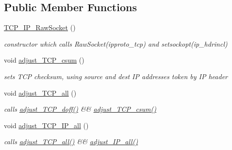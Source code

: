 \subsection*{Public Member Functions}
\begin{CompactItemize}
\item 
\hypertarget{classsocketpp_1_1TCP__IP__RawSocket_1b08f12274fd9590f805bc876c44edd9}{
\hyperlink{classsocketpp_1_1TCP__IP__RawSocket_1b08f12274fd9590f805bc876c44edd9}{TCP\_\-IP\_\-RawSocket} ()}
\label{classsocketpp_1_1TCP__IP__RawSocket_1b08f12274fd9590f805bc876c44edd9}

\begin{CompactList}\small\item\em constructor which calls RawSocket(ipproto\_\-tcp) and setsockopt(ip\_\-hdrincl) \item\end{CompactList}\item 
\hypertarget{classsocketpp_1_1TCP__IP__RawSocket_c203b188308532333bdf53a4e18bc230}{
void \hyperlink{classsocketpp_1_1TCP__IP__RawSocket_c203b188308532333bdf53a4e18bc230}{adjust\_\-TCP\_\-csum} ()}
\label{classsocketpp_1_1TCP__IP__RawSocket_c203b188308532333bdf53a4e18bc230}

\begin{CompactList}\small\item\em sets TCP checksum, using source and dest IP addresses token by IP header \item\end{CompactList}\item 
\hypertarget{classsocketpp_1_1TCP__IP__RawSocket_3644327ff72d322ff809ac432f59783b}{
void \hyperlink{classsocketpp_1_1TCP__IP__RawSocket_3644327ff72d322ff809ac432f59783b}{adjust\_\-TCP\_\-all} ()}
\label{classsocketpp_1_1TCP__IP__RawSocket_3644327ff72d322ff809ac432f59783b}

\begin{CompactList}\small\item\em calls \hyperlink{classsocketpp_1_1TCP__RawSocket_029eb8bfbf19531253edf046775d9f5f}{adjust\_\-TCP\_\-doff()} \&\& \hyperlink{classsocketpp_1_1TCP__IP__RawSocket_c203b188308532333bdf53a4e18bc230}{adjust\_\-TCP\_\-csum()} \item\end{CompactList}\item 
\hypertarget{classsocketpp_1_1TCP__IP__RawSocket_dd3b21314f1768962bf399291f406768}{
void \hyperlink{classsocketpp_1_1TCP__IP__RawSocket_dd3b21314f1768962bf399291f406768}{adjust\_\-TCP\_\-IP\_\-all} ()}
\label{classsocketpp_1_1TCP__IP__RawSocket_dd3b21314f1768962bf399291f406768}

\begin{CompactList}\small\item\em calls \hyperlink{classsocketpp_1_1TCP__IP__RawSocket_3644327ff72d322ff809ac432f59783b}{adjust\_\-TCP\_\-all()} \&\& \hyperlink{classsocketpp_1_1IP__RawSocket_45e60510233daaa2f279d3a4706fdce5}{adjust\_\-IP\_\-all()} \item\end{CompactList}\end{CompactItemize}
